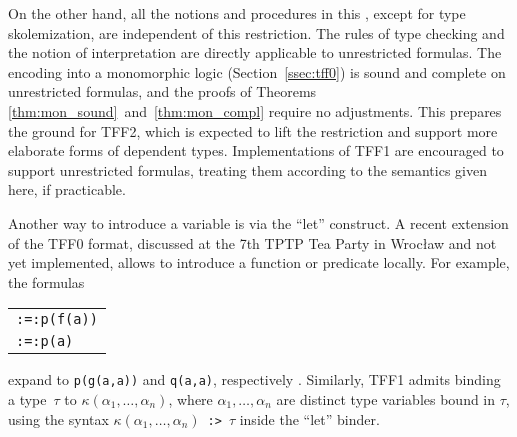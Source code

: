 On the other hand, all the notions and procedures in this \paper, except for
type skolemization, are independent of this restriction.
The rules of type checking and the notion of interpretation are
directly applicable to unrestricted formulas. The encoding into a monomorphic
logic (Section~\ref{ssec:tff0}) is sound and complete on unrestricted formulas,
and the proofs of Theorems \ref{thm:mon_sound}~and~\ref{thm:mon_compl} require
no adjustments. This prepares the ground for TFF2, which is expected to lift the
restriction and support more elaborate forms of dependent types. Implementations
of TFF1 are encouraged to support unrestricted formulas, treating them according
to the semantics given here, if practicable.

Another way to introduce a variable is via the ``let'' construct.
A recent extension of the TFF0 format, discussed at the 7th TPTP Tea Party in
Wrocław and not yet implemented, allows to introduce a function or predicate
locally. For example, the formulas
\begin{center}
\begin{tabular}{l}
{\tt :=\;[X\;:\;\$int,\;f(X)\;=\;g(X,\;X)]:\;p(f(a))} \\[\smallskipamount]
{\tt :=\;[X\;:\;\$int,\;p(X)\;<=>\;q(X,\;X)]:\;p(a)}
\end{tabular}
\end{center}
expand to {\tt p(g(a,\;a))} and {\tt q(a,\;a)}, respectively
\cite{geoff-tptptp-notes}.
Similarly, TFF1 admits binding a type~$\tau$ to $\kappa(\alpha_1, \ldots,
\alpha_n)$, where $\alpha_1, \ldots, \alpha_n$ are distinct type variables bound
in $\tau$, using the syntax $\kappa(\alpha_1, \ldots, \alpha_n)$~{\tt :>}~$\tau$ inside
the ``let'' binder.
%
%
